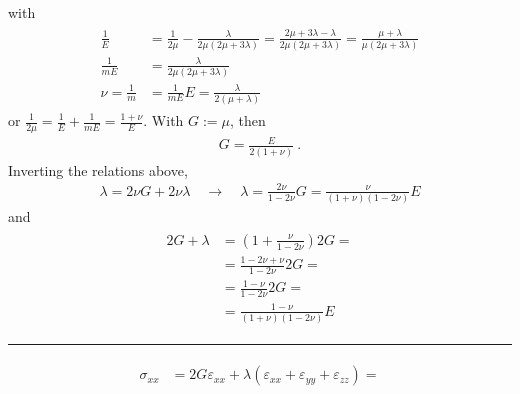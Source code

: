 \documentclass[letterpaper,10pt,english]{jupyterBook}
\begin{document}
\sphinxAtStartPar
with
\begin{equation*}
\begin{split}\begin{aligned}
\frac{1}{E} & = \frac{1}{2 \mu} - \frac{\lambda}{2 \mu ( 2 \mu + 3 \lambda)} = \frac{2 \mu + 3 \lambda - \lambda}{2 \mu ( 2 \mu + 3 \lambda)} = \frac{\mu + \lambda}{\mu ( 2 \mu + 3 \lambda) } \\
\frac{1}{m E} & = \frac{\lambda}{2 \mu ( 2 \mu + 3 \lambda)} \\
\nu = \frac{1}{m} & = \frac{1}{m E} E = \frac{\lambda}{2 ( \mu + \lambda )}
\end{aligned}\end{split}
\end{equation*}
\sphinxAtStartPar
or \(\frac{1}{2\mu} = \frac{1}{E} + \frac{1}{mE} = \frac{1+\nu}{E}\). With \(G := \mu\), then
\begin{equation*}
\begin{split}G = \frac{E}{2 ( 1 + \nu ) } \ .\end{split}
\end{equation*}
\sphinxAtStartPar
Inverting the relations above,
\begin{equation*}
\begin{split}
\lambda = 2 \nu G + 2 \nu \lambda
\quad \rightarrow \quad
\lambda = \frac{2 \nu}{1 - 2 \nu} G = \frac{\nu}{(1+\nu)(1-2\nu)} E
\end{split}
\end{equation*}
\sphinxAtStartPar
and
\begin{equation*}
\begin{split}\begin{aligned}
  2 G + \lambda 
  & = \left( 1 + \frac{\nu}{1 - 2 \nu} \right) 2 G = \\
  & = \frac{1-2\nu+\nu}{1-2\nu} 2 G = \\
  & = \frac{1 - \nu}{1 - 2 \nu} 2 G = \\
  & = \frac{1 - \nu}{(1+\nu)(1-2\nu)} E
\end{aligned}\end{split}
\end{equation*}

\bigskip\hrule\bigskip

\begin{equation*}
\begin{split}\begin{aligned}
  \sigma_{xx}
  & = 2 G \varepsilon_{xx} + \lambda ( \varepsilon_{xx} + \varepsilon_{yy} + \varepsilon_{zz} ) = \\
\end{aligned}\end{split}
\end{equation*}
\end{document}
